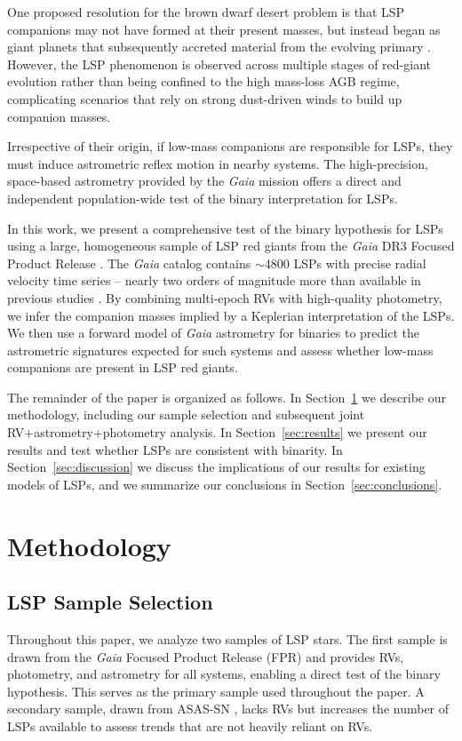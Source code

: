 \documentclass[trackchanges,twocolumn]{aastex631}
\begin{document}
One proposed resolution for the brown dwarf desert problem is that LSP companions may not have formed at their present masses, but instead began as giant planets that subsequently accreted material from the evolving primary \citep[e.g.,][]{Soszynski21}. However, the LSP phenomenon is observed across multiple stages of red-giant evolution \citep[e.g.,][]{Pawlak21, Pawlak24} rather than being confined to the high mass-loss AGB regime, complicating scenarios that rely on strong dust-driven winds to build up companion masses.

Irrespective of their origin, if low-mass companions are responsible for LSPs, they must induce astrometric reflex motion in nearby systems. The high-precision, space-based astrometry provided by the {\it Gaia} mission offers a direct and independent population-wide test of the binary interpretation for LSPs.

In this work, we present a comprehensive test of the binary hypothesis for LSPs using a large, homogeneous sample of LSP red giants from the {\it Gaia} DR3 Focused Product Release \citep{Gaia_FPR}. The {\it Gaia} catalog contains $\sim$4800 LSPs with precise radial velocity time series -- nearly two orders of magnitude more than available in previous studies \citep[e.g.,][]{Nicholls09}.
By combining multi-epoch RVs with high-quality photometry, we infer the companion masses implied by a Keplerian interpretation of the LSPs. We then use a forward model of {\it Gaia} astrometry for binaries \citep[{\tt gaiamock};][]{ElBadry24} to predict the astrometric signatures expected for such systems and assess whether low-mass companions are present in LSP red giants. 

The remainder of the paper is organized as follows. 
In Section~\ref{sec:methodology} we describe our methodology, including our sample selection and subsequent joint RV+astrometry+photometry analysis. In Section~\ref{sec:results} we present our results and test whether LSPs are consistent with binarity. In Section~\ref{sec:discussion} we discuss the implications of our results for existing models of LSPs, and we summarize our conclusions in Section~\ref{sec:conclusions}.

\section{Methodology}\label{sec:methodology}
\subsection{LSP Sample Selection}\label{subsec:methodology_sample}
Throughout this paper, we analyze two samples of LSP stars. The first sample is drawn from the {\it Gaia} Focused Product Release (FPR) \citep[][]{Gaia_FPR} and provides RVs, photometry, and astrometry for all systems, enabling a direct test of the binary hypothesis. This serves as the primary sample used throughout the paper.
A secondary sample, drawn from ASAS-SN \citep[][]{Pawlak24}, lacks RVs but increases the number of LSPs available to assess trends that are not heavily reliant on RVs.
\end{document}
